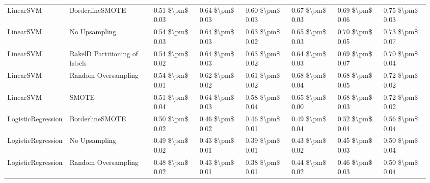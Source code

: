 \begin{tabular}{llllllll}
                      LinearSVM &               BorderlineSMOTE & 0.51 \$\textbackslash pm\$ 0.03 &           0.64 \$\textbackslash pm\$ 0.03 &       0.60 \$\textbackslash pm\$ 0.03 &        0.67 \$\textbackslash pm\$ 0.03 &                         0.69 \$\textbackslash pm\$ 0.06 & 0.75 \$\textbackslash pm\$ 0.03 \\
                      LinearSVM &                 No Upsampling & 0.54 \$\textbackslash pm\$ 0.03 &           0.64 \$\textbackslash pm\$ 0.03 &       0.63 \$\textbackslash pm\$ 0.02 &        0.65 \$\textbackslash pm\$ 0.03 &                         0.70 \$\textbackslash pm\$ 0.05 & 0.73 \$\textbackslash pm\$ 0.07 \\
                      LinearSVM & RakelD Partitioning of labels & 0.54 \$\textbackslash pm\$ 0.02 &           0.64 \$\textbackslash pm\$ 0.03 &       0.63 \$\textbackslash pm\$ 0.02 &        0.64 \$\textbackslash pm\$ 0.03 &                         0.69 \$\textbackslash pm\$ 0.07 & 0.70 \$\textbackslash pm\$ 0.04 \\
                      LinearSVM &           Random Oversampling & 0.54 \$\textbackslash pm\$ 0.01 &           0.62 \$\textbackslash pm\$ 0.02 &       0.61 \$\textbackslash pm\$ 0.02 &        0.68 \$\textbackslash pm\$ 0.04 &                         0.68 \$\textbackslash pm\$ 0.05 & 0.72 \$\textbackslash pm\$ 0.02 \\
                      LinearSVM &                         SMOTE & 0.51 \$\textbackslash pm\$ 0.04 &           0.64 \$\textbackslash pm\$ 0.03 &       0.58 \$\textbackslash pm\$ 0.04 &        0.65 \$\textbackslash pm\$ 0.00 &                         0.68 \$\textbackslash pm\$ 0.03 & 0.72 \$\textbackslash pm\$ 0.02 \\
             LogisticRegression &               BorderlineSMOTE & 0.50 \$\textbackslash pm\$ 0.02 &           0.46 \$\textbackslash pm\$ 0.02 &       0.46 \$\textbackslash pm\$ 0.01 &        0.49 \$\textbackslash pm\$ 0.04 &                         0.52 \$\textbackslash pm\$ 0.04 & 0.56 \$\textbackslash pm\$ 0.04 \\
             LogisticRegression &                 No Upsampling & 0.49 \$\textbackslash pm\$ 0.02 &           0.43 \$\textbackslash pm\$ 0.01 &       0.39 \$\textbackslash pm\$ 0.01 &        0.43 \$\textbackslash pm\$ 0.02 &                         0.45 \$\textbackslash pm\$ 0.03 & 0.50 \$\textbackslash pm\$ 0.04 \\
             LogisticRegression &           Random Oversampling & 0.48 \$\textbackslash pm\$ 0.02 &           0.43 \$\textbackslash pm\$ 0.01 &       0.38 \$\textbackslash pm\$ 0.01 &        0.44 \$\textbackslash pm\$ 0.02 &                         0.46 \$\textbackslash pm\$ 0.03 & 0.50 \$\textbackslash pm\$ 0.04 \\

\end{tabular}
